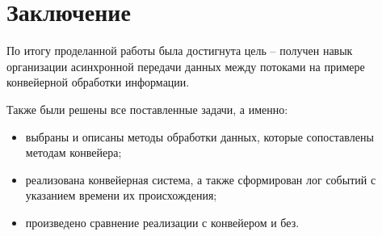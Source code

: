 \chapter*{Заключение}
По итогу проделанной работы была достигнута цель -- получен навык организации асинхронной передачи данных между потоками на примере конвейерной обработки информации.

Также были решены все поставленные задачи, а именно:

\begin{itemize}
	\item выбраны и описаны методы обработки данных, которые сопоставлены методам конвейера;
	\item реализована конвейерная система, а также сформирован лог событий с указанием времени их происхождения;
	\item произведено сравнение реализации с конвейером и без.
\end{itemize}